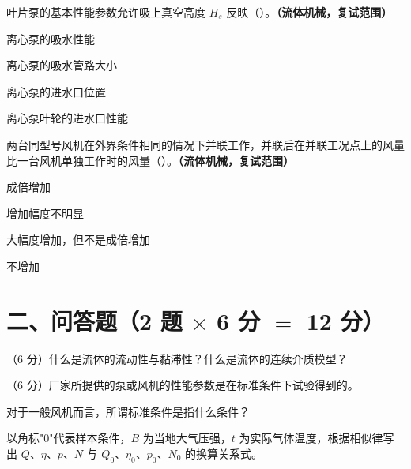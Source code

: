 \begin{ti}
\item 叶片泵的基本性能参数允许吸上真空高度 $H_s$ 反映（\quad）。\textbf{（流体机械，复试范围）}
\begin{choices}
\item 离心泵的吸水性能
\item 离心泵的吸水管路大小
\item 离心泵的进水口位置
\item 离心泵叶轮的进水口性能
\end{choices}

\item 两台同型号风机在外界条件相同的情况下并联工作，并联后在并联工况点上的风量比一台风机单独工作时的风量（\quad）。\textbf{（流体机械，复试范围）}
\begin{choices}
\item 成倍增加
\item 增加幅度不明显
\item 大幅度增加，但不是成倍增加
\item 不增加
\end{choices}

\end{ti}

\section*{二、问答题（2 题 $\times$ 6 分 $=$ 12 分）}

\begin{ti}

\item （6 分）什么是流体的流动性与黏滞性？什么是流体的连续介质模型？

\item （6 分）厂家所提供的泵或风机的性能参数是在标准条件下试验得到的。
\begin{xiaowen}
\item 对于一般风机而言，所谓标准条件是指什么条件？
\item 以角标"0"代表样本条件，$B$ 为当地大气压强，$t$ 为实际气体温度，根据相似律写出 $Q$、$\eta$、$p$、$N$ 与 $Q_0$、$\eta_0$、$p_0$、$N_0$ 的换算关系式。
\end{xiaowen}

\end{ti}

